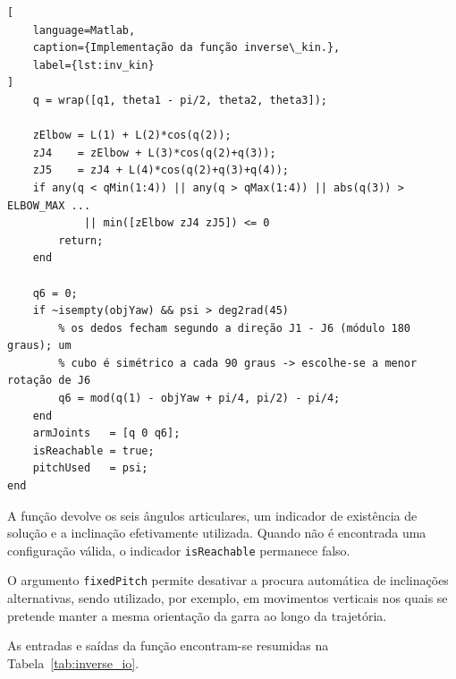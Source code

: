 \begin{lstlisting}[
    language=Matlab,
    caption={Implementação da função inverse\_kin.},
    label={lst:inv_kin}
]
    q = wrap([q1, theta1 - pi/2, theta2, theta3]);

    zElbow = L(1) + L(2)*cos(q(2));
    zJ4    = zElbow + L(3)*cos(q(2)+q(3));
    zJ5    = zJ4 + L(4)*cos(q(2)+q(3)+q(4));
    if any(q < qMin(1:4)) || any(q > qMax(1:4)) || abs(q(3)) > ELBOW_MAX ...
            || min([zElbow zJ4 zJ5]) <= 0
        return;
    end

    q6 = 0;
    if ~isempty(objYaw) && psi > deg2rad(45)
        % os dedos fecham segundo a direção J1 - J6 (módulo 180 graus); um
        % cubo é simétrico a cada 90 graus -> escolhe-se a menor rotação de J6
        q6 = mod(q(1) - objYaw + pi/4, pi/2) - pi/4;
    end
    armJoints   = [q 0 q6];
    isReachable = true;
    pitchUsed   = psi;
end
\end{lstlisting}

A função devolve os seis ângulos articulares, um indicador de existência de solução e a inclinação efetivamente utilizada. Quando não é encontrada uma configuração válida, o indicador \texttt{isReachable} permanece falso.

O argumento \texttt{fixedPitch} permite desativar a procura automática de inclinações alternativas, sendo utilizado, por exemplo, em movimentos verticais nos quais se pretende manter a mesma orientação da garra ao longo da trajetória.

As entradas e saídas da função encontram-se resumidas na Tabela~\ref{tab:inverse_io}.

